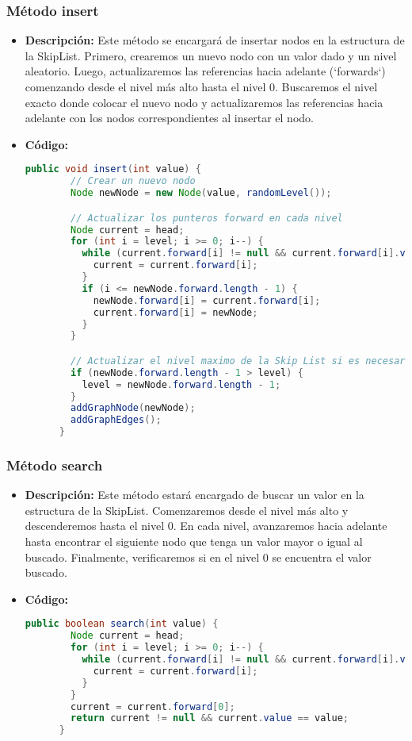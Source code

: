 \documentclass{article}
\begin{document}
  \subsubsection{Método insert}
  \begin{itemize}
    \item \textbf{Descripción: }Este método se encargará de insertar nodos en la estructura de la SkipList. Primero, 
    crearemos un nuevo nodo con un valor dado y un nivel aleatorio. Luego, actualizaremos las referencias hacia adelante 
    (`forwards`) comenzando desde el nivel más alto hasta el nivel 0. Buscaremos el nivel exacto donde colocar el nuevo nodo 
    y actualizaremos las referencias hacia adelante con los nodos correspondientes al insertar el nodo.
    \item \textbf{Código: }
    \begin{lstlisting}[language=Java, caption={Método insert}]
      public void insert(int value) {
        // Crear un nuevo nodo
        Node newNode = new Node(value, randomLevel());

        // Actualizar los punteros forward en cada nivel
        Node current = head;
        for (int i = level; i >= 0; i--) {
          while (current.forward[i] != null && current.forward[i].value < value) {
            current = current.forward[i];
          }
          if (i <= newNode.forward.length - 1) {
            newNode.forward[i] = current.forward[i];
            current.forward[i] = newNode;
          }
        }

        // Actualizar el nivel maximo de la Skip List si es necesario
        if (newNode.forward.length - 1 > level) {
          level = newNode.forward.length - 1;
        }
        addGraphNode(newNode);
        addGraphEdges();
      }
    \end{lstlisting}
  \end{itemize}
  

  \subsubsection{Método search}
  \begin{itemize}
    \item \textbf{Descripción: }Este método estará encargado de buscar un valor en la estructura de la SkipList. 
    Comenzaremos desde el nivel más alto y descenderemos hasta el nivel 0. En cada nivel, avanzaremos hacia adelante 
    hasta encontrar el siguiente nodo que tenga un valor mayor o igual al buscado. Finalmente, verificaremos si en el 
    nivel 0 se encuentra el valor buscado.
    \item \textbf{Código: }
    \begin{lstlisting}[language=Java, caption={Método search}]
      public boolean search(int value) {
        Node current = head;
        for (int i = level; i >= 0; i--) {
          while (current.forward[i] != null && current.forward[i].value < value) {
            current = current.forward[i];
          }
        }
        current = current.forward[0];
        return current != null && current.value == value;
      }
    \end{lstlisting}
  \end{itemize}
  
\end{document}
